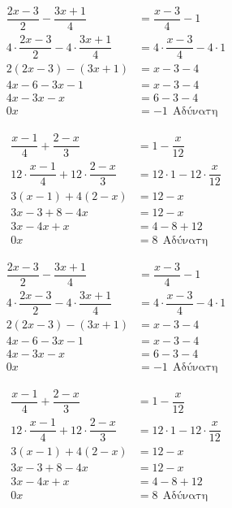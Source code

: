 \begin{alist}
\item \begin{align*}
\dfrac{2x-3}{2}-\dfrac{3x+1}{4}&=\dfrac{x-3}{4}-1\\
4\cdot\dfrac{2x-3}{2}-4\cdot\dfrac{3x+1}{4}&=4\cdot\dfrac{x-3}{4}-4\cdot 1\\
2(2x-3)-(3x+1)&=x-3-4\\
4x-6-3x-1&=x-3-4\\
4x-3x-x&=6-3-4\\
0x&=-1\ \ \text{Αδύνατη}
\end{align*}
\item \begin{align*}
\dfrac{x-1}{4}+\dfrac{2-x}{3}&=1-\dfrac{x}{12}\\
12\cdot\dfrac{x-1}{4}+12\cdot\dfrac{2-x}{3}&=12\cdot1-12\cdot\dfrac{x}{12}\\
3(x-1)+4(2-x)&=12-x\\
3x-3+8-4x&=12-x\\
3x-4x+x&=4-8+12\\
0x&=8\ \ \text{Αδύνατη}
\end{align*}
\end{alist}
\begin{alist}
\item \begin{align*}
\dfrac{2x-3}{2}-\dfrac{3x+1}{4}&=\dfrac{x-3}{4}-1\\
4\cdot\dfrac{2x-3}{2}-4\cdot\dfrac{3x+1}{4}&=4\cdot\dfrac{x-3}{4}-4\cdot 1\\
2(2x-3)-(3x+1)&=x-3-4\\
4x-6-3x-1&=x-3-4\\
4x-3x-x&=6-3-4\\
0x&=-1\ \ \text{Αδύνατη}
\end{align*}
\item \begin{align*}
\dfrac{x-1}{4}+\dfrac{2-x}{3}&=1-\dfrac{x}{12}\\
12\cdot\dfrac{x-1}{4}+12\cdot\dfrac{2-x}{3}&=12\cdot1-12\cdot\dfrac{x}{12}\\
3(x-1)+4(2-x)&=12-x\\
3x-3+8-4x&=12-x\\
3x-4x+x&=4-8+12\\
0x&=8\ \ \text{Αδύνατη}
\end{align*}
\end{alist}
